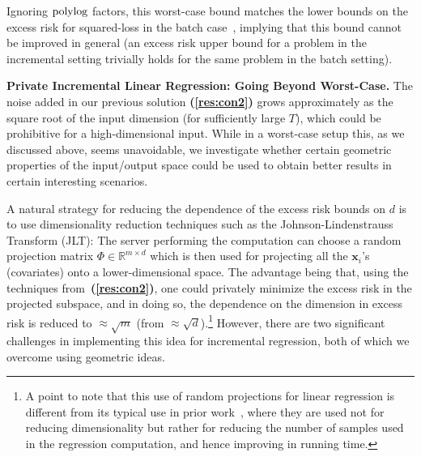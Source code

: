 \documentclass{article}
\theoremstyle{plain}
\newcommand{\resref}[1]{{\bf (\ref{res:#1})}}
\def \polylog{\mbox{\rm polylog}}
\def \x {\mathbf x}
\def \R {\mathbb{R}}
\begin{document}
\begin{list}{{\bf ()}}{
\setlength{\leftmargin}{12pt}
\setlength{\listparindent}{\parindent}
\setlength{\parsep}{0pt}}
Ignoring $\polylog$ factors, this worst-case bound matches the lower bounds on the excess risk for squared-loss in the batch case~\cite{bassily2014differentially}, implying that this bound cannot be improved in general (an excess risk upper bound for a problem in the incremental setting trivially holds for the same problem in the batch setting). 


\item \label{res:con3} \textbf{Private Incremental Linear Regression: Going Beyond Worst-Case.} 
The noise added in our previous solution \resref{con2} grows approximately as the square root of the input dimension (for sufficiently large $T$), which could be prohibitive for a high-dimensional input. While in a worst-case setup this, as we discussed above, seems unavoidable, we investigate whether certain geometric properties of the input/output space could be used to obtain better results in certain interesting scenarios.

A natural strategy for reducing the dependence of the excess risk bounds on $d$ is to use dimensionality reduction techniques such as the Johnson-Lindenstrauss Transform (JLT): The server performing the computation can choose a random projection matrix $\Phi \in \R^{m \times d}$ which is then used for projecting all the $\x_i$'s (covariates) onto a lower-dimensional space. The advantage being that, using the techniques from~\resref{con2}, one could privately minimize the excess risk in the projected subspace, and in doing so, the dependence on the dimension in excess risk is reduced to $\approx \sqrt{m}$ (from $\approx \sqrt{d}$).\footnote{A point to note that this use of random projections for linear regression is different from its typical use in prior work~\cite{TCS-060}, where they are used not for reducing dimensionality but rather for reducing the number of samples used in the regression computation, and hence improving in running time.} However, there are two significant challenges in implementing this idea for incremental regression, both of which we overcome using geometric ideas. 


\end{list}
\end{document}
